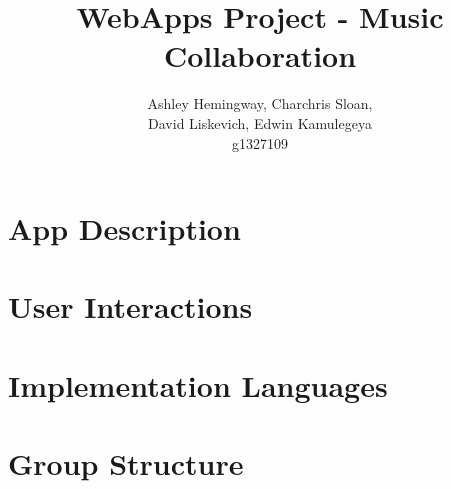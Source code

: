 \documentclass{article}
\title{WebApps Project - Music Collaboration}
\author{Ashley Hemingway, Charchris Sloan, \\ David Liskevich, Edwin Kamulegeya \\ g1327109}
\begin{document}
\maketitle

\section{App Description}

\section{User Interactions}

\section{Implementation Languages}

\section{Group Structure}
\end{document}
